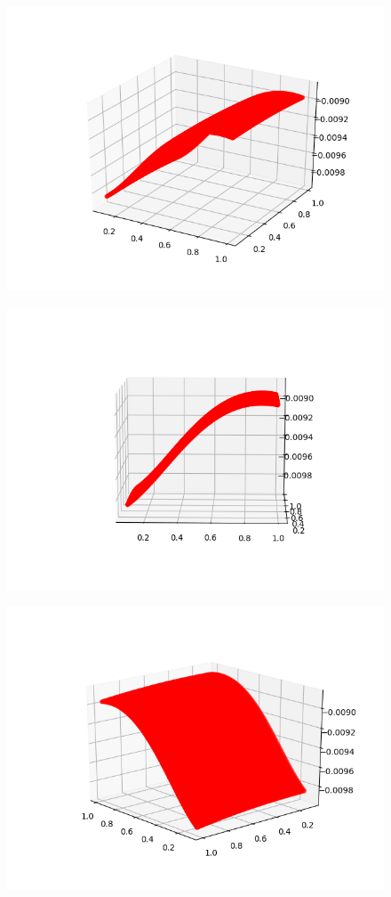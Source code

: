 \documentclass[12pt]{article}
\begin{document}
\begin{itemize}
		\begin{figure}[H]
			\includegraphics[scale=0.5]{x1.png}
		\end{figure}
		\begin{figure}[H]
			\includegraphics[scale=0.5]{x2.png}
		\end{figure}
		\begin{figure}[H]
			\includegraphics[scale=0.5]{x3.png}
		\end{figure}
		

\end{itemize}
\end{document}
